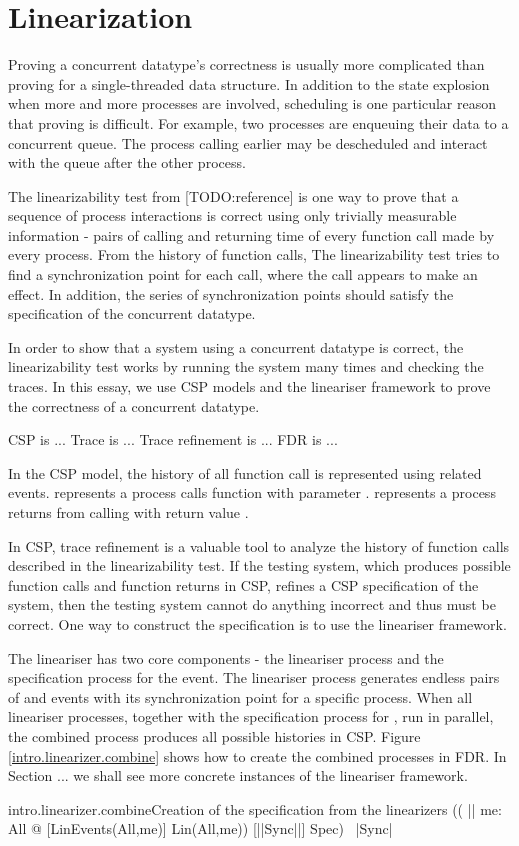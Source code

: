 \section{Linearization}
Proving a concurrent datatype's correctness is usually more complicated than proving for a single-threaded data structure. In addition to the state explosion when more and more processes are involved, scheduling is one particular reason that proving is difficult. For example, two processes are enqueuing their data to a concurrent queue. The process calling earlier may be descheduled and interact with the queue after the other process.

The linearizability test from [TODO:reference] is one way to prove that a sequence of process interactions is correct using only trivially measurable information - pairs of calling and returning time of every function call made by every process.   From the history of function calls, The linearizability test tries to find a synchronization point for each call, where the call appears to make an effect. In addition, the series of synchronization points should satisfy the specification of the concurrent datatype.

In order to show that a system using a concurrent datatype is correct, the linearizability test works by running the system many times and checking the traces. In this essay, we use CSP models and the lineariser framework to prove the correctness of a concurrent datatype.

CSP is ... Trace is ... Trace refinement is ... FDR is ...

In the CSP model, the history of all function call is represented using related events.  represents a process calls function  with parameter .  represents a process returns from calling  with return value .

In CSP, trace refinement is a valuable tool to analyze the history of function calls described in the linearizability test. If the testing system, which produces possible function calls and function returns in CSP, refines a CSP specification of the system, then the testing system cannot do anything incorrect and thus must be correct. One way to construct the specification is to use the lineariser framework.

The lineariser has two core components - the lineariser process and the specification process for the  event. The lineariser process generates endless pairs of  and  events with its synchronization point for a specific process. When all lineariser processes, together with the specification process for , run in parallel, the combined process produces all possible histories in CSP. Figure \ref{intro.linearizer.combine} shows how to create the combined processes in FDR. In Section ... we shall see more concrete instances of the lineariser framework.
\begin{cspinline}{intro.linearizer.combine}{Creation of the specification from the linearizers}
(( || me: All @ [LinEvents(All,me)]  Lin(All,me)) [|{|Sync|}|] Spec) \ {|Sync|}
\end{cspinline}
